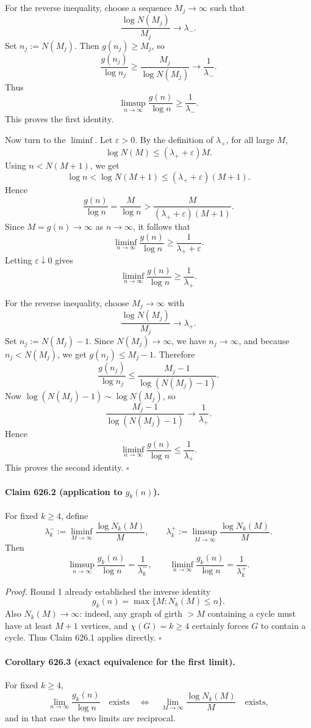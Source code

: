 For the reverse inequality, choose a sequence \(M_j\to\infty\) such that
\[
\frac{\log N(M_j)}{M_j}\to \lambda_-.
\]
Set \(n_j:=N(M_j)\). Then \(g(n_j)\ge M_j\), so
\[
\frac{g(n_j)}{\log n_j}\ge \frac{M_j}{\log N(M_j)}\to \frac{1}{\lambda_-}.
\]
Thus
\[
\limsup_{n\to\infty}\frac{g(n)}{\log n}\ge \frac{1}{\lambda_-}.
\]
This proves the first identity.

Now turn to the \(\liminf\). Let \(\varepsilon>0\). By the definition of \(\lambda_+\), for all large \(M\),
\[
\log N(M)\le (\lambda_++\varepsilon)M.
\]
Using \(n<N(M+1)\), we get
\[
\log n<\log N(M+1)\le (\lambda_++\varepsilon)(M+1).
\]
Hence
\[
\frac{g(n)}{\log n}=\frac{M}{\log n}
>
\frac{M}{(\lambda_++\varepsilon)(M+1)}.
\]
Since \(M=g(n)\to\infty\) as \(n\to\infty\), it follows that
\[
\liminf_{n\to\infty}\frac{g(n)}{\log n}\ge \frac{1}{\lambda_++\varepsilon}.
\]
Letting \(\varepsilon\downarrow 0\) gives
\[
\liminf_{n\to\infty}\frac{g(n)}{\log n}\ge \frac{1}{\lambda_+}.
\]

For the reverse inequality, choose \(M_j\to\infty\) with
\[
\frac{\log N(M_j)}{M_j}\to \lambda_+.
\]
Set \(n_j:=N(M_j)-1\). Since \(N(M_j)\to\infty\), we have \(n_j\to\infty\), and because
\(n_j<N(M_j)\), we get \(g(n_j)\le M_j-1\). Therefore
\[
\frac{g(n_j)}{\log n_j}\le
\frac{M_j-1}{\log(N(M_j)-1)}.
\]
Now \(\log(N(M_j)-1)\sim \log N(M_j)\), so
\[
\frac{M_j-1}{\log(N(M_j)-1)}\to \frac{1}{\lambda_+}.
\]
Hence
\[
\liminf_{n\to\infty}\frac{g(n)}{\log n}\le \frac{1}{\lambda_+}.
\]
This proves the second identity. \(\square\)

\paragraph{Claim 626.2 (application to \(g_k(n)\)).}
For fixed \(k\ge 4\), define
\[
\lambda_k^-:=\liminf_{M\to\infty}\frac{\log N_k(M)}{M},
\qquad
\lambda_k^+:=\limsup_{M\to\infty}\frac{\log N_k(M)}{M}.
\]
Then
\[
\limsup_{n\to\infty}\frac{g_k(n)}{\log n}=\frac{1}{\lambda_k^-},
\qquad
\liminf_{n\to\infty}\frac{g_k(n)}{\log n}=\frac{1}{\lambda_k^+}.
\]

\emph{Proof.}
Round 1 already established the inverse identity
\[
g_k(n)=\max\{M:N_k(M)\le n\}.
\]
Also \(N_k(M)\to\infty\): indeed, any graph of girth \(>M\) containing a cycle must have at least \(M+1\) vertices, and \(\chi(G)=k\ge 4\) certainly forces \(G\) to contain a cycle.
Thus Claim 626.1 applies directly. \(\square\)

\paragraph{Corollary 626.3 (exact equivalence for the first limit).}
For fixed \(k\ge 4\),
\[
\lim_{n\to\infty}\frac{g_k(n)}{\log n}
\quad\text{exists}
\quad\Longleftrightarrow\quad
\lim_{M\to\infty}\frac{\log N_k(M)}{M}
\quad\text{exists},
\]
and in that case the two limits are reciprocal.

